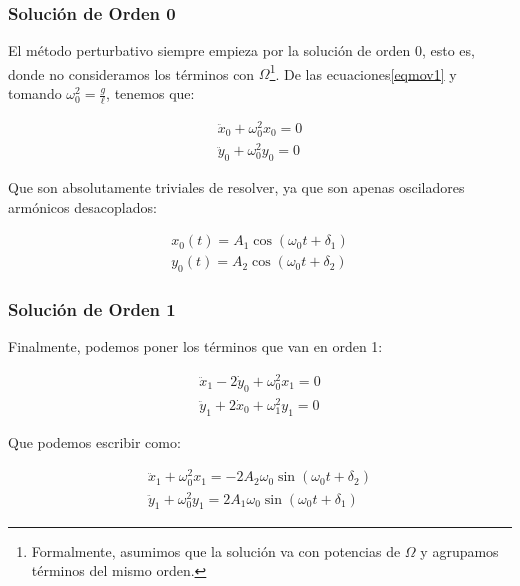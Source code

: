 \documentclass[a4paper,12pt]{article}
\begin{document}
\subsubsection*{Solución de Orden 0}
El método perturbativo siempre empieza por la solución de orden 0, esto es, donde no consideramos los términos con $\Omega$\footnote{Formalmente, asumimos que la solución va con potencias de $\Omega$ y agrupamos términos del mismo orden.}. De las ecuaciones\eqref{eqmov1} y tomando $\omega_{0}^2 = \frac{g}{\ell} $, tenemos que:

\begin{equation}
  \label{0th}
  \begin{aligned}
  \ddot{x}_0 + \omega_0^2 x_0 = 0\\
  \ddot{y}_0 + \omega_0^2 y_0 = 0
\end{aligned}
\end{equation}

Que son absolutamente triviales de resolver, ya que son apenas osciladores armónicos desacoplados:

\begin{equation}
\begin{aligned}
  x_0(t) = A_1 \cos(\omega_0 t + \delta_1)\\
  y_0(t) = A_2 \cos(\omega_0 t + \delta_2) 
\end{aligned}
\end{equation}

\subsubsection{Solución de Orden 1}
Finalmente, podemos poner los términos que van en orden 1:

\begin{equation*}
\begin{aligned}
  \ddot{x}_1 - 2 \dot{y}_0 + \omega_0^2 x_1 = 0\\
  \ddot{y}_1 + 2 \dot{x}_0 + \omega_1^2 y_1 = 0
\end{aligned}
\end{equation*}

Que podemos escribir como:

\begin{equation}
\begin{aligned}
  \ddot{x}_1 + \omega_0^2 x_1 = -2A_2 \omega_0 \sin(\omega_0 t + \delta_2)\\
  \ddot{y}_1 + \omega_0^2 y_1 = 2A_1 \omega_0 \sin(\omega_0 t + \delta_1)
\end{aligned}
  \label{1st}
\end{equation}
\end{document}
